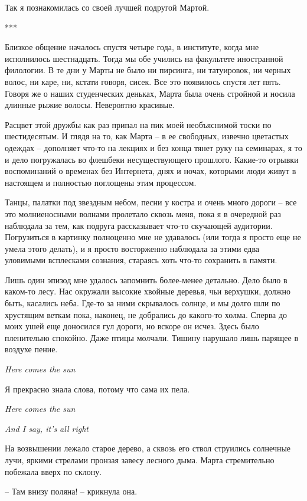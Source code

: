 \documentclass[
]{book}
\begin{document}
Так я познакомилась со своей лучшей подругой Мартой.

***

Близкое общение началось спустя четыре года, в институте, когда мне исполнилось шестнадцать. Тогда мы обе учились на факультете иностранной филологии. В те дни у Марты не было ни пирсинга, ни татуировок, ни черных волос, ни каре, ни, кстати говоря, сисек. Все это появилось спустя лет пять. Говоря же о наших студенческих деньках, Марта была очень стройной и носила длинные рыжие волосы. Невероятно красивые.

Расцвет этой дружбы как раз припал на пик моей необъяснимой тоски по шестидесятым. И глядя на то, как Марта -- в ее свободных, извечно цветастых одеждах -- дополняет что-то на лекциях и без конца тянет руку на семинарах, я то и дело погружалась во флешбеки несуществующего прошлого. Какие-то отрывки воспоминаний о временах без Интернета, днях и ночах, которыми люди живут в настоящем и полностью поглощены этим процессом.

Танцы, палатки под звездным небом, песни у костра и очень много дороги -- все это молниеносными волнами пролетало сквозь меня, пока я в очередной раз наблюдала за тем, как подруга рассказывает что-то скучающей аудитории. Погрузиться в картинку полноценно мне не удавалось (или тогда я просто еще не умела этого делать), и я просто восторженно наблюдала за этими едва уловимыми всплесками сознания, стараясь хоть что-то сохранить в памяти.

Лишь один эпизод мне удалось запомнить более-менее детально. Дело было в каком-то лесу. Нас окружали высокие хвойные деревья, чьи верхушки, должно быть, касались неба. Где-то за ними скрывалось солнце, и мы долго шли по хрустящим веткам пока, наконец, не добрались до какого-то холма. Сперва до моих ушей еще доносился гул дороги, но вскоре он исчез. Здесь было пленительно спокойно. Даже птицы молчали. Тишину нарушало лишь парящее в воздухе пение.

\emph{Here comes the sun}

Я прекрасно знала слова, потому что сама их пела.

\emph{Here comes the sun}

\emph{And I say, it's all right}

На возвышении лежало старое дерево, а сквозь его ствол струились солнечные лучи, яркими стрелами пронзая завесу лесного дыма. Марта стремительно побежала вверх по склону.

-- Там внизу поляна! -- крикнула она.
\end{document}
